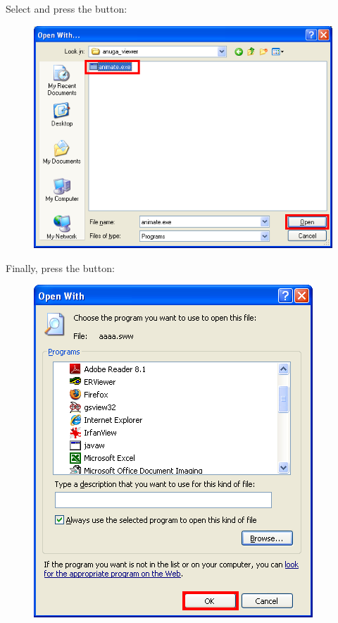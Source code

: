 \documentclass{manual}
\begin{document}
\pagebreak

Select  and press the  button:
\begin{figure}[ht]
  \centerline{\includegraphics[scale=0.5]{installgraphics/winassoc5.png}}
  \label{fig:winassoc5}
\end{figure}

Finally, press the  button:
\begin{figure}[ht]
  \centerline{\includegraphics[scale=0.5]{installgraphics/winassoc6.png}}
  \label{fig:winassoc6}
\end{figure}
\end{document}
